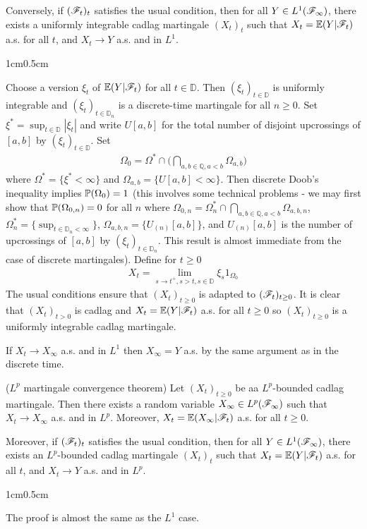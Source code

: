 \documentclass[12pt,a4paper]{report}
\newenvironment{proof}
{\begin{changemargin}{1cm}{0.5cm} 
	}%
	{\end{changemargin}
}
\begin{document}
\quad Conversely, if $(\mathscr{F}_t)_t$ satisfies the usual condition, then for all $Y\in L^1(\mathscr{F}_{\infty})$, there exists a uniformly integrable cadlag martingale $(X_t)_t$ such that $X_t = \mathbb{E}(Y|\mathscr{F}_t)$ a.s. for all $t$, and $X_t \rightarrow Y$ a.s. and in $L^1$.
\begin{proof}
\pf Choose a version $\xi_t$ of $\mathbb{E}(Y|\mathscr{F}_t)$ for all $t\in \mathbb{D}$. Then $(\xi_t)_{t \in \mathbb{D}}$ is uniformly integrable and $(\xi_t)_{t\in \mathbb{D}_n}$ is a discrete-time martingale for all $n\geq 0$. Set $\xi^* = \sup_{t\in \mathbb{D}} |\xi_t|$ and write $U[a,b]$ for the total number of disjoint upcrossings of $[a,b]$ by $(\xi_t)_{t\in \mathbb{D}}$. Set
\begin{align*}
\Omega_0 = \Omega^* \cap \Big(\bigcap_{a,b\in \mathbb{Q},a<b} \Omega_{a,b} \Big)
\end{align*} 
where $\Omega^* = \{ \xi^* <\infty \}$ and $\Omega_{a,b} =\{U[a,b] <\infty \}$. Then discrete Doob's inequality implies $\mathbb{P}(\Omega_0)=1$ (this involves some technical problems - we may first show that $\mathbb{P}(\Omega_{0,n}) =0$ for all $n$ where $\Omega_{0,n} = \Omega^*_n \cap \bigcap_{a,b\in \mathbb{Q},a<b} \Omega_{a,b,n}$, $\Omega^*_n = \{\sup_{t\in \mathbb{D}_n < \infty } \}$, $\Omega_{a,b,n} = \{ U_{(n)}[a,b]\}$, and $U_{(n)}[a,b]$ is the number of upcrossings of $[a,b]$ by $(\xi_t)_{t\in \mathbb{D}_n}$. This result is almost immediate from the case of discrete martingales). Define for $t\geq 0$
\begin{align*}
X_t = \lim_{s\rightarrow t^+, s>t,s\in \mathbb{D}} \xi_s 1_{\Omega_0} 
\end{align*}
The usual conditions ensure that $(X_t)_{t\geq 0}$ is adapted to $(\mathscr{F}_t)_{t\geq 0}$. It is clear that $(X_t)_{t>0}$ is cadlag and $X_t = \mathbb{E}(Y|\mathscr{F}_t)$ a.s. for all $t \geq 0$ so $(X_t)_{t\geq 0}$ is a uniformly integrable cadlag martingale.

\quad If $X_t \rightarrow X_{\infty}$ a.s. and in $L^1$ then $X_{\infty} = Y$ a.s. by the same argument as in the discrete time.

\eop
\end{proof}
\s

 ($L^p$ martingale convergence theorem) Let $(X_t)_{t\geq 0}$ be aa $L^p$-bounded cadlag martingale. Then there exists a random variable $X_{\infty} \in L^p(\mathscr{F}_{\infty})$ such that $X_t \rightarrow X_{\infty}$ a.s. and in $L^p$. Moreover, $X_t = \mathbb{E}(X_{\infty}|\mathscr{F}_t)$ a.s. for all $t\geq 0$.

\quad Moreover, if $(\mathscr{F}_t)_t$ satisfies the usual condition, then for all $Y\in L^1(\mathscr{F}_{\infty})$, there exists an $L^p$-bounded cadlag martingale $(X_t)_t$ such that $X_t = \mathbb{E}(Y|\mathscr{F}_t)$ a.s. for all $t$, and $X_t \rightarrow Y$ a.s. and in $L^p$.
\begin{proof}
\pf The proof is almost the same as the $L^1$ case.

\eop
\end{proof}
\s
\end{document}
